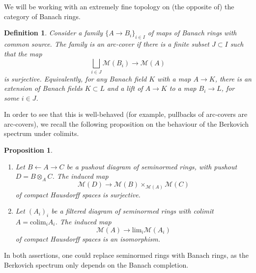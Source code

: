 \documentclass[11pt]{amsart}
\numberwithin{equation}{section}
\numberwithin{theorem}{section}
\newtheorem{proposition}[theorem]{Proposition}
\newtheorem{definition}[theorem]{Definition}
\theoremstyle{definition}
\begin{document}
We will be working with an extremely fine topology on (the opposite of) the category of Banach rings.

\begin{definition}\label{def:arccover} Consider a family $\{A\to B_i\}_{i\in I}$ of maps of Banach rings with common source. The family is an arc-cover if there is a finite subset $J\subset I$ such that the map
\[
\bigsqcup_{i\in J} \mathcal M(B_i)\to \mathcal M(A)
\]
is surjective. Equivalently, for any Banach field $K$ with a map $A\to K$, there is an extension of Banach fields $K\subset L$ and a lift of $A\to K$ to a map $B_i\to L$, for some $i\in J$.
\end{definition}

In order to see that this is well-behaved (for example, pullbacks of arc-covers are arc-covers), we recall the following proposition on the behaviour of the Berkovich spectrum under colimits.

\begin{proposition}\label{prop:berkovichspectrumcolimit}\leavevmode\begin{enumerate}
\item[{\rm (i)}] Let $B\leftarrow A\to C$ be a pushout diagram of seminormed rings, with pushout $D=B\otimes_A C$. The induced map
\[
\mathcal M(D)\to \mathcal M(B)\times_{\mathcal M(A)} \mathcal M(C)
\]
of compact Hausdorff spaces is surjective.
\item[{\rm (ii)}] Let $(A_i)_i$ be a filtered diagram of seminormed rings with colimit $A=\mathrm{colim}_i A_i$. The induced map
\[
\mathcal M(A)\to \mathrm{lim}_i \mathcal M(A_i)
\]
of compact Hausdorff spaces is an isomorphism.
\end{enumerate}
\end{proposition}

In both assertions, one could replace seminormed rings with Banach rings, as the Berkovich spectrum only depends on the Banach completion.
\end{document}
